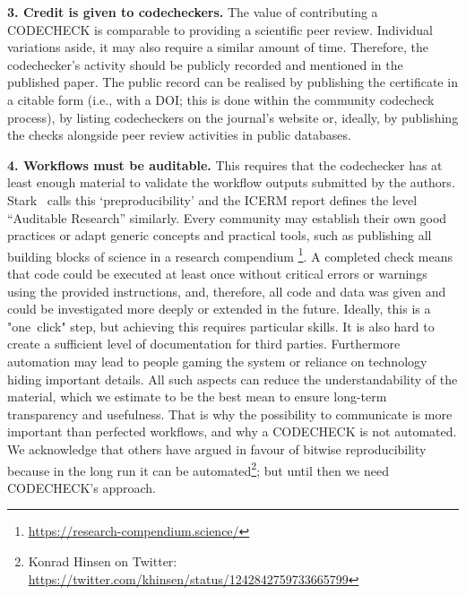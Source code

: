 \documentclass[12pt]{article}
\begin{document}
\textbf{3. Credit is given to codecheckers.} The value of contributing a
CODECHECK is comparable to providing a scientific peer review. Individual
variations aside, it may also require a similar amount of time. Therefore,
the codechecker's activity should be publicly recorded and mentioned in the
published paper.
The public record can be realised by publishing the certificate in a 
citable form (i.e., with a DOI; this is done within the community codecheck
process), by listing codecheckers on the journal's website or, ideally, by
publishing the checks alongside peer review activities in public databases.

\textbf{4. Workflows must be auditable.}
This requires that the codechecker 
has at least enough material to validate the workflow outputs submitted by 
the authors. Stark~\cite{stark_before_2018} calls this `preproducibility'
and the ICERM report \cite{stodden_setting_2013} defines the level
``Auditable Research''  similarly.
Every community may establish their own good practices or adapt generic
concepts and practical tools, such as publishing all building blocks
of science in a research compendium
\footnote{\url{https://research-compendium.science/}}.
A completed check means that code could be executed at least once without
critical errors or
warnings using the provided instructions, and, therefore, all code and data 
was given and could be investigated more deeply or extended in the future.
Ideally, this is a "one~click" step, but achieving this requires particular 
skills. It is also hard to create a sufficient level of documentation for 
third parties. Furthermore automation may lead to people gaming the system
or reliance on technology hiding important details. All such aspects can
reduce the understandability of the material, which we estimate to be the
best mean to ensure long-term transparency and usefulness.
That is why the possibility to communicate is more important
than perfected workflows, and why a CODECHECK is not automated.
We acknowledge that others have argued in favour of bitwise reproducibility
because in the long run it can be automated\footnote{Konrad Hinsen on 
Twitter: \url{https://twitter.com/khinsen/status/1242842759733665799}};
but until then we need CODECHECK's approach.
\end{document}
